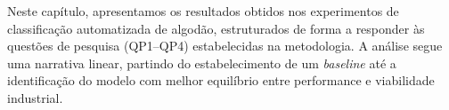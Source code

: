 Neste capítulo, apresentamos os resultados obtidos nos experimentos de classificação automatizada de algodão, estruturados de forma a responder às questões de pesquisa (QP1--QP4) estabelecidas na metodologia. A análise segue uma narrativa linear, partindo do estabelecimento de um \textit{baseline} até a identificação do modelo com melhor equilíbrio entre performance e viabilidade industrial.







